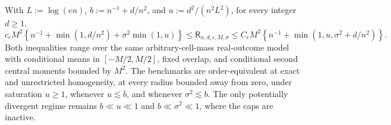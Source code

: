 With \(L:=\log(en)\), \(b:=n^{-1}+d/n^2\), and \(u:=d^2/(n^2L^2)\), for every integer \(d\ge1\),
\[
 c_{\epsilon}M^2\left\{n^{-1}+\min(1,d/n^2)+\sigma^2\min(1,u)\right\}
 \le\mathsf R_{n,d,\epsilon,M,\sigma}
 \le C_{\epsilon}M^2\left\{n^{-1}+\min(1,u,\sigma^2+d/n^2)\right\}.
\]
Both inequalities range over the same arbitrary-cell-mass real-outcome model with conditional means in \([-M/2,M/2]\), fixed overlap, and conditional second central moments bounded by \(M^2\).  The benchmarks are order-equivalent at exact and unrestricted homogeneity, at every radius bounded away from zero, under saturation \(u\ge1\), whenever \(u\lesssim b\), and whenever \(\sigma^2\lesssim b\).  The only potentially divergent regime remains \(b\ll u\ll1\) and \(b\ll\sigma^2\ll1\), where the caps are inactive.